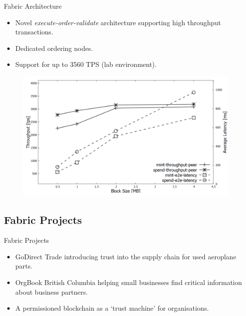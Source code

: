 \begin{frame}{Fabric Architecture}
    \begin{itemize}
        \item Novel \textit{execute-order-validate} architecture
              supporting high throughput transactions.
        \item Dedicated ordering nodes.
        \item Support for up to 3560 TPS (lab environment).
    \end{itemize}
    \begin{figure}
        \includegraphics[height=0.4\textheight, width=\linewidth,
            keepaspectratio]{photos/tps.png}
        \centering
    \end{figure}
\end{frame}
\subsection{Fabric Projects}
\begin{frame}{Fabric Projects}
    \begin{itemize}
        \item GoDirect Trade introducing trust into the supply chain for used
              aeroplane parts.
        \item OrgBook British Columbia helping small businesses find critical
              information about business partners.
        \item A permissioned blockchain as a `trust machine' for organisations.
    \end{itemize}
\end{frame}
